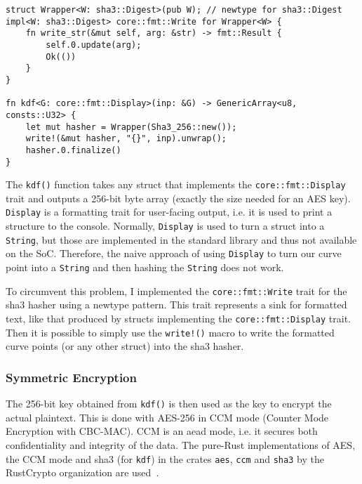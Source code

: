 \begin{lstlisting}[float=h,caption={Hash-based key derivation function for curve points},label={lst:kdf}]
struct Wrapper<W: sha3::Digest>(pub W); // newtype for sha3::Digest
impl<W: sha3::Digest> core::fmt::Write for Wrapper<W> {
    fn write_str(&mut self, arg: &str) -> fmt::Result {
        self.0.update(arg);
        Ok(())
    }
}

fn kdf<G: core::fmt::Display>(inp: &G) -> GenericArray<u8, consts::U32> {
    let mut hasher = Wrapper(Sha3_256::new());
    write!(&mut hasher, "{}", inp).unwrap();
    hasher.0.finalize()
}
\end{lstlisting}

The \verb+kdf()+ function takes any struct that implements the \texttt{core::fmt::Display} trait and outputs a 256-bit byte array (exactly the size needed for an AES key).
\texttt{Display} is a formatting trait for user-facing output, i.e. it is used to print a structure to the console.
Normally, \texttt{Display} is used to turn a struct into a \verb+String+, but those are implemented in the standard library and thus not available on the SoC.
Therefore, the naive approach of using \texttt{Display} to turn our curve point into a \texttt{String} and then hashing the \texttt{String} does not work.

To circumvent this problem, I implemented the \verb+core::fmt::Write+ trait for the \acrshort{sha3} hasher using a newtype pattern.
This trait represents a sink for formatted text, like that produced by structs implementing the \verb+core::fmt::Display+ trait.
Then it is possible to simply use the \verb+write!()+ macro to write the formatted curve points (or any other struct) into the \acrshort{sha3} hasher.

\subsubsection{Symmetric Encryption}

The 256-bit key obtained from \texttt{kdf()} is then used as the key to encrypt the actual plaintext.
This is done with AES-256 in CCM mode (Counter Mode Encryption with CBC-MAC).
CCM is an \acrshort{aead} mode, i.e. it secures both confidentiality and integrity of the data.
The pure-Rust implementations of AES, the CCM mode and \acrshort{sha3} (for \texttt{kdf}) in the \glspl{crate} \texttt{aes}, \texttt{ccm} and \texttt{sha3} by the RustCrypto organization are used~\cite{noauthor_rustcrypto_nodate}.

